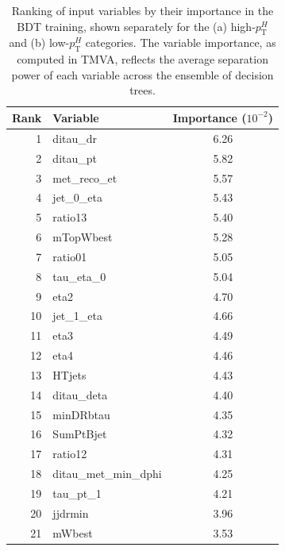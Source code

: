 \begin{table}[h]
  \centering
  \scriptsize
  \caption{Ranking of input variables by their importance in the BDT training, shown separately for the (a) high-$p_{\mathrm{T}}^{H}$ and (b) low-$p_{\mathrm{T}}^{H}$ categories. The variable importance, as computed in TMVA, reflects the average separation power of each variable across the ensemble of decision trees.}
  \renewcommand{\arraystretch}{1.05}
  \setlength{\tabcolsep}{2.5pt} %
  \begin{subtable}[t]{0.48\textwidth}
    \centering
    \begin{tabular}{r l c}
      \toprule
      \textbf{Rank} & \textbf{Variable} & \textbf{Importance} \tiny{($10^{-2}$)} \\
      \midrule
       1 & ditau\_dr               & 6.26 \\
       2 & ditau\_pt               & 5.82 \\
       3 & met\_reco\_et           & 5.57 \\
       4 & jet\_0\_eta             & 5.43 \\
       5 & ratio13                 & 5.40 \\
       6 & mTopWbest               & 5.28 \\
       7 & ratio01                 & 5.05 \\
       8 & tau\_eta\_0             & 5.04 \\
       9 & eta2                    & 4.70 \\
      10 & jet\_1\_eta               & 4.66 \\
      11 & eta3                    & 4.49 \\
      12 & eta4                    & 4.46 \\
      13 & HTjets                  & 4.43 \\
      14 & ditau\_deta              & 4.40 \\
      15 & minDRbtau               & 4.35 \\
      16 & SumPtBjet               & 4.32 \\
      17 & ratio12                 & 4.31 \\
      18 & ditau\_met\_min\_dphi      & 4.25 \\
      19 & tau\_pt\_1                & 4.21 \\
      20 & jjdrmin                 & 3.96 \\
      21 & mWbest                  & 3.53 \\

\end{tabular}
\end{subtable}
\end{table}
